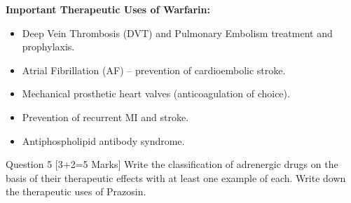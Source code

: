 \documentclass[11pt,a4paper]{article}
\begin{document}
\begin{ansbox}
\textbf{Important Therapeutic Uses of Warfarin:}
\begin{itemize}[leftmargin=*]
    \item Deep Vein Thrombosis (DVT) and Pulmonary Embolism treatment and prophylaxis.
    \item Atrial Fibrillation (AF) -- prevention of cardioembolic stroke.
    \item Mechanical prosthetic heart valves (anticoagulation of choice).
    \item Prevention of recurrent MI and stroke.
    \item Antiphospholipid antibody syndrome.
\end{itemize}
\end{ansbox}

\begin{qbox}{Question 5 [3+2=5 Marks]}
Write the classification of adrenergic drugs on the basis of their therapeutic effects with at least one example of each. Write down the therapeutic uses of Prazosin.
\end{qbox}
\end{document}
